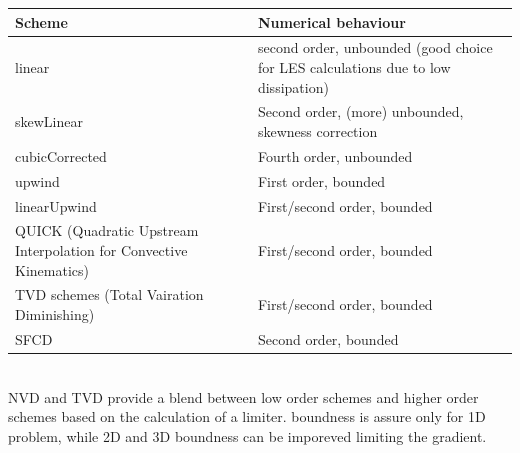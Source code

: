 \documentclass[a4paper,12pt]{article}
\begin{document}
\begin{tabular}{ |p{6cm}|p{10cm}|  }
 \hline
 Scheme & Numerical behaviour \\ [0.5ex] 
 \hline\hline
 linear & second order, unbounded (good choice for LES calculations due to low dissipation) \\ 
 \hline
 skewLinear & Second order, (more) unbounded, skewness correction  \\
 \hline
 cubicCorrected & Fourth order, unbounded  \\
 \hline
 upwind & First order, bounded  \\
 \hline
 linearUpwind & First/second order, bounded  \\
 \hline
 QUICK (Quadratic Upstream Interpolation for Convective Kinematics) & First/second order, bounded   \\
 \hline
 TVD schemes (Total Vairation Diminishing) & First/second order, bounded   \\
 \hline
 SFCD & Second order, bounded   \\
 \hline
 \hline

\end{tabular}
\\ NVD and TVD provide a blend between low order schemes and higher order schemes based on the calculation of a limiter. boundness is assure only for 1D problem, while 2D and 3D boundness can be imporeved limiting the gradient.
\end{document}
